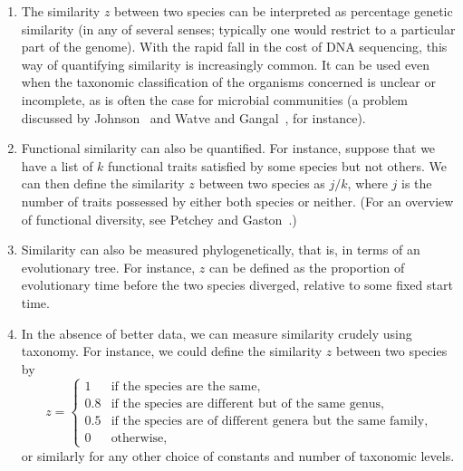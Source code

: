 \begin{examples}
\begin{enumerate}
\item 
The similarity $z$ between two species can be interpreted as percentage
genetic%
% 
% 
similarity (in any of several senses; typically one would restrict
to a particular part of the genome).  With the rapid fall in the cost of
DNA sequencing, this way of quantifying similarity is increasingly common.
It can be used even when the taxonomic classification of the organisms
concerned is unclear or
incomplete, as is often the case for microbial%
%
% 
communities (a problem discussed by Johnson~\cite{JohnUNA} and Watve and
Gangal~\cite{WaGa}, for instance).

\item
Functional
% 
%
% 
similarity can also be quantified.  For instance, suppose that we have a
list of $k$ functional traits satisfied by some species but not others. We
can then define the similarity $z$ between two species as $j/k$, where $j$
is the number of traits possessed by either both species or neither.  (For
an overview of functional diversity, see Petchey and
Gaston~\cite{PeGaFDB}.)

\item
{}
Similarity can also be measured phylogenetically,%
% 
% 
that is, in terms of an evolutionary tree.  For instance, $z$ can be
defined as the proportion of evolutionary time before the two species
diverged, relative to some fixed start time.

\item
{}
In the absence of better data, we can measure similarity crudely
using taxonomy.%
% 
%
% 
For instance, we could define the similarity $z$ between
two species by
\[
z
=
\begin{cases}
1       &\text{if the species are the same,}    \\
0.8     &\text{if the species are different but of the same genus,}     \\
0.5     &\text{if the species are of different genera but the same
  family,}      \\
0       &\text{otherwise},
\end{cases}
\]
or similarly for any other choice of constants and number of taxonomic
levels. 


\end{enumerate}
\end{examples}
